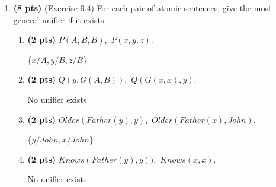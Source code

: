 \documentclass{article}
\begin{document}
\begin{enumerate}
\begin{enumerate}[label=($\alph*$)]
    \end{enumerate}



\item \textbf{(8 pts)} (Exercise 9.4) For each pair of atomic sentences, give the most general unifier if it exists:

    \begin{enumerate}[label=($\alph*$)]


    \item \textbf{(2 pts)} $P(A, B, B),$ $P(x, y, z).$

    \color{blue}
        \{$x/A, y/B, z/B$\}
    \color{black}



    \item \textbf{(2 pts)} $Q(y, G(A, B)),$ $Q(G(x, x), y).$

    \color{blue}
        No unifier exists
    \color{black}



    \item \textbf{(2 pts)} $Older(Father(y), y),$ $Older(Father(x), John).$

    \color{blue}
        \{$y/John, x/John$\}
    \color{black}



    \item \textbf{(2 pts)} $Knows(Father(y), y)),$ $Knows(x, x).$

    \color{blue}
        No unifier exists
    \color{black}

    
    \end{enumerate}


\end{enumerate}
\end{document}
